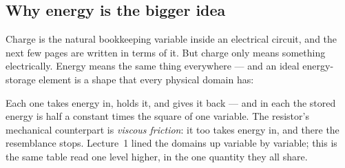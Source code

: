 \documentclass[11pt,a4paper]{article}
\newcommand{\Icol}[1]{\textcolor{ccur}{#1}}
\newcommand{\Vcol}[1]{\textcolor{cvolt}{#1}}
\newcommand{\Qcol}[1]{\textcolor{ccharge}{#1}}
\begin{document}
\begin{center}
\end{center}

\subsection{Why energy is the bigger idea}

Charge is the natural bookkeeping variable inside an electrical circuit, and the next few
pages are written in terms of it. But charge only means something electrically. Energy
means the same thing everywhere --- and an ideal energy-storage element is a shape that every
physical domain has:

\begin{center}
\end{center}

Each one takes energy in, holds it, and gives it back --- and in each the stored energy is
half a constant times the square of one variable. The resistor's mechanical counterpart is
\emph{viscous friction}: it too takes energy in, and there the resemblance stops.
Lecture~1 lined the domains up variable by variable; this is the same table read one level
higher, in the one quantity they all share.
\end{document}
